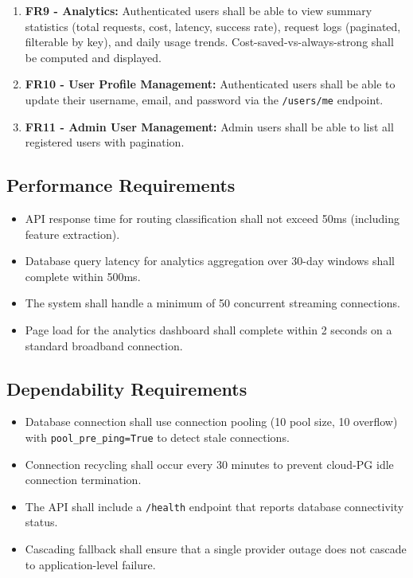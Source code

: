 \documentclass[12pt,a4paper]{report}
\begin{document}
\begin{enumerate}[nosep]
    \item \textbf{FR9 - Analytics:} Authenticated users shall be able to view summary statistics (total requests, cost, latency, success rate), request logs (paginated, filterable by key), and daily usage trends. Cost-saved-vs-always-strong shall be computed and displayed.
    \item \textbf{FR10 - User Profile Management:} Authenticated users shall be able to update their username, email, and password via the \texttt{/users/me} endpoint.
    \item \textbf{FR11 - Admin User Management:} Admin users shall be able to list all registered users with pagination.
\end{enumerate}

\subsection{Performance Requirements}

\begin{itemize}[nosep]
    \item API response time for routing classification shall not exceed 50ms (including feature extraction).
    \item Database query latency for analytics aggregation over 30-day windows shall complete within 500ms.
    \item The system shall handle a minimum of 50 concurrent streaming connections.
    \item Page load for the analytics dashboard shall complete within 2 seconds on a standard broadband connection.
\end{itemize}

\subsection{Dependability Requirements}

\begin{itemize}[nosep]
    \item Database connection shall use connection pooling (10 pool size, 10 overflow) with \texttt{pool\_pre\_ping=True} to detect stale connections.
    \item Connection recycling shall occur every 30 minutes to prevent cloud-PG idle connection termination.
    \item The API shall include a \texttt{/health} endpoint that reports database connectivity status.
    \item Cascading fallback shall ensure that a single provider outage does not cascade to application-level failure.
\end{itemize}
\end{document}
